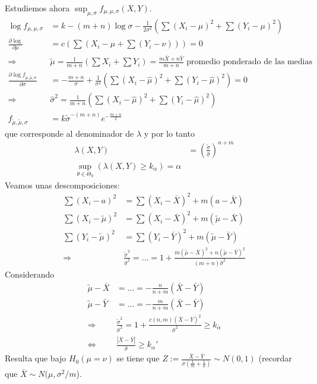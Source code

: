 \documentclass[10pt]{article}
\theoremstyle{plain}
\theoremstyle{definition}
\begin{document}
Estudiemos ahora $\sup_{\mu,\sigma}f_{\mu,\mu,\sigma}(X,Y)$.
\begin{align*}
\log f_{\mu,\mu,\sigma} &= k- (m+n)\log \sigma - \frac{1}{2\sigma^2}\left(\sum (X_{i}-\mu)^2+\sum (Y_{i}-\mu)^2\right)\\
\frac{\partial \log}{\partial \mu} &= c\left(\sum (X_{i}-\mu + \sum (Y_{i}-\nu))\right) = 0\\
\Rightarrow &\tilde{\mu} = \frac{1}{m+n}\left(\sum X_{i}+ \sum Y_{i}\right) = \frac{m\bar{X}+n\bar{Y}}{m+n} \text{ promedio ponderado de las medias}\\
\frac{\partial \log f_{\tilde{\mu},\tilde{\mu},\sigma}}{\partial \sigma} &= -\frac{m+n}{\sigma} + \frac{1}{\sigma^2}\left(\sum (X_{i}-\hat{\mu})^2+\sum (Y_{i}-\hat{\mu})^2\right)  = 0\\
\Rightarrow & \hat{\sigma}^2 = \frac{1}{m+n}\left(\sum (X_{i}-\hat{\mu})^2+\sum (Y_{i}-\hat{\mu})^2\right)\\
f_{\tilde{\mu},\tilde{\mu},\sigma} &= k \tilde{\sigma}^{-(m+n)}e^{-\frac{m+n}{2}}
\end{align*}
que corresponde al denominador de $\lambda$ y por lo tanto
\begin{align*}
\lambda(X,Y) &= \left(\frac{\tilde{\sigma}}{\hat{\sigma}}\right)^{n+m}\\
\sup_{\theta\in\Theta_{0}}(\lambda(X,Y)\ge k_{\alpha}) = \alpha
\end{align*}
Veamos unas descomposiciones:
\begin{align*}
\sum (X_{i}-a)^2 &= \sum (X_{i}-\bar{X})^2 + m (a-\bar{X})\\
\sum (X_{i}-\tilde{\mu})^2 &= \sum (X_{i}-\bar{X})^2 + m (\tilde{\mu}-\bar{X})\\
\sum (Y_{i}-\tilde{\mu})^2 &= \sum (Y_{i}-\bar{Y})^2 + m (\tilde{\mu}-\bar{Y})\\
\Rightarrow & \frac{\tilde{\sigma}^2}{\hat{\sigma}^2} = \ldots = 1+\frac{m(\tilde{\mu}-\bar{X})^2+n(\tilde{\mu}-\bar{Y})^2}{(m+n)\hat{\sigma}^2}
\end{align*}
Considerando
\begin{align*}
\tilde{\mu}-\bar{X} &= \ldots = -\frac{n}{n+m}(\bar{X}-\bar{Y})\\
\tilde{\mu}-\bar{Y} &= \ldots = -\frac{m}{n+m}(\bar{X}-\bar{Y})\\
\Rightarrow & \frac{\tilde{\sigma}^2}{\hat{\sigma}^2} = 1+\frac{c(n,m)(\bar{X}-\bar{Y})^2}{\hat{\sigma}^2} \ge k_{\alpha}\\
\Leftrightarrow & \frac{|\bar{X}-\bar{Y}|}{\hat{\sigma}} \ge k_{\alpha}'
\end{align*}
Resulta que bajo $H_{0} (\mu=\nu)$ se tiene que $Z:= \frac{\bar{X}-\bar{Y}}{\sigma\left(\frac{1}{m}+\frac{1}{n}\right)}\sim N(0,1)$ (recordar que $\bar{X} \sim N(\mu,\sigma^2/m$).\\
\end{document}
